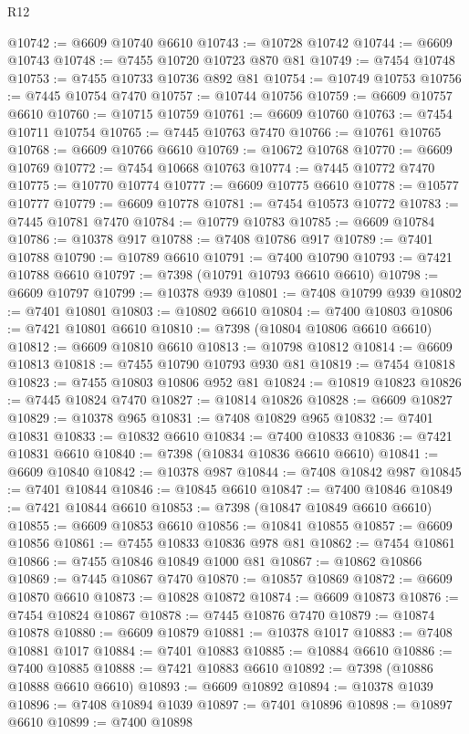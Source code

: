 \begin{lexlean}{R12}
\begin{coremodule}
{{{{{{{{{{{{{{{{{{{{{{{{{{{{{{{{{{{{{{{{{{{{{{{{{{{{{{{{{{{{{{{{{{{{{{{{{{{{{{{{{{@10742 := @6609 @10740 @6610
@10743 := @10728 @10742
@10744 := @6609 @10743
@10748 := @7455 @10720 @10723 @870 @81
@10749 := @7454 @10748
@10753 := @7455 @10733 @10736 @892 @81
@10754 := @10749 @10753
@10756 := @7445 @10754 @7470
@10757 := @10744 @10756
@10759 := @6609 @10757 @6610
@10760 := @10715 @10759
@10761 := @6609 @10760
@10763 := @7454 @10711 @10754
@10765 := @7445 @10763 @7470
@10766 := @10761 @10765
@10768 := @6609 @10766 @6610
@10769 := @10672 @10768
@10770 := @6609 @10769
@10772 := @7454 @10668 @10763
@10774 := @7445 @10772 @7470
@10775 := @10770 @10774
@10777 := @6609 @10775 @6610
@10778 := @10577 @10777
@10779 := @6609 @10778
@10781 := @7454 @10573 @10772
@10783 := @7445 @10781 @7470
@10784 := @10779 @10783
@10785 := @6609 @10784
@10786 := @10378 @917
@10788 := @7408 @10786 @917
@10789 := @7401 @10788
@10790 := @10789 @6610
@10791 := @7400 @10790
@10793 := @7421 @10788 @6610
@10797 := @7398 (@10791 @10793 @6610 @6610)
@10798 := @6609 @10797
@10799 := @10378 @939
@10801 := @7408 @10799 @939
@10802 := @7401 @10801
@10803 := @10802 @6610
@10804 := @7400 @10803
@10806 := @7421 @10801 @6610
@10810 := @7398 (@10804 @10806 @6610 @6610)
@10812 := @6609 @10810 @6610
@10813 := @10798 @10812
@10814 := @6609 @10813
@10818 := @7455 @10790 @10793 @930 @81
@10819 := @7454 @10818
@10823 := @7455 @10803 @10806 @952 @81
@10824 := @10819 @10823
@10826 := @7445 @10824 @7470
@10827 := @10814 @10826
@10828 := @6609 @10827
@10829 := @10378 @965
@10831 := @7408 @10829 @965
@10832 := @7401 @10831
@10833 := @10832 @6610
@10834 := @7400 @10833
@10836 := @7421 @10831 @6610
@10840 := @7398 (@10834 @10836 @6610 @6610)
@10841 := @6609 @10840
@10842 := @10378 @987
@10844 := @7408 @10842 @987
@10845 := @7401 @10844
@10846 := @10845 @6610
@10847 := @7400 @10846
@10849 := @7421 @10844 @6610
@10853 := @7398 (@10847 @10849 @6610 @6610)
@10855 := @6609 @10853 @6610
@10856 := @10841 @10855
@10857 := @6609 @10856
@10861 := @7455 @10833 @10836 @978 @81
@10862 := @7454 @10861
@10866 := @7455 @10846 @10849 @1000 @81
@10867 := @10862 @10866
@10869 := @7445 @10867 @7470
@10870 := @10857 @10869
@10872 := @6609 @10870 @6610
@10873 := @10828 @10872
@10874 := @6609 @10873
@10876 := @7454 @10824 @10867
@10878 := @7445 @10876 @7470
@10879 := @10874 @10878
@10880 := @6609 @10879
@10881 := @10378 @1017
@10883 := @7408 @10881 @1017
@10884 := @7401 @10883
@10885 := @10884 @6610
@10886 := @7400 @10885
@10888 := @7421 @10883 @6610
@10892 := @7398 (@10886 @10888 @6610 @6610)
@10893 := @6609 @10892
@10894 := @10378 @1039
@10896 := @7408 @10894 @1039
@10897 := @7401 @10896
@10898 := @10897 @6610
@10899 := @7400 @10898
}}}}}}}}}}}}}}}}}}}}}}}}}}}}}}}}}}}}}}}}}}}}}}}}}}}}}}}}}}}}}}}}}}}}}}}}}}}}}}}}}}
\end{coremodule}
\end{lexlean}
